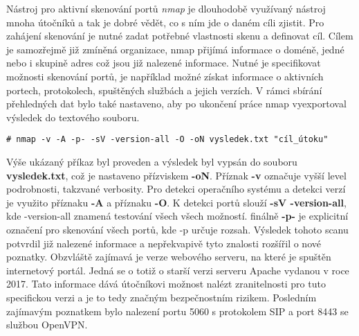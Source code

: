 Nástroj pro aktivní skenování portů \textit{nmap} je dlouhodobě využívaný nástroj mnoha útočníků a tak je dobré vědět, co s ním jde o daném cíli zjistit.
Pro zahájení skenování je nutné zadat potřebné vlastnosti skenu a definovat cíl.
Cílem je samozřejmě již zmíněná organizace, nmap přijímá informace o doméně, jedné nebo i skupině adres což jsou již nalezené informace.
Nutné je specifikovat možnosti skenování portů, je například možné získat informace o aktivních portech, protokolech, spuštěných službách a jejich verzích.
V rámci sbírání přehledných dat bylo také nastaveno, aby po ukončení práce nmap vyexportoval výsledek do textového souboru.

\begin{codeblock}
	\begin{verbatim}
# nmap -v -A -p- -sV -version-all -O -oN vysledek.txt "cíl_útoku"
	\end{verbatim}
\end{codeblock}

Výše ukázaný příkaz byl proveden a výsledek byl vypsán do souboru \textbf{vysledek.txt}, což je nastaveno přízviskem \textbf{-oN}.
Příznak \textbf{-v} označuje vyšší level podrobnosti, takzvané verbosity.
Pro detekci operačního systému a detekci verzí je využito příznaku \textbf{-A} a příznaku \textbf{-O}.
K detekci portů slouží \textbf{-sV -version-all}, kde -version-all znamená testování všech všech možností.
finálně \textbf{-p-} je explicitní označení pro skenování všech portů, kde -p určuje rozsah.
Výsledek tohoto scanu potvrdil již nalezené informace a nepřekvapivě tyto znalosti rozšířil o nové poznatky.
Obzvláště zajímavá je verze webového serveru, na které je spuštěn internetový portál.
Jedná se o totiž o starší verzi serveru Apache vydanou v roce 2017.
Tato informace dává útočníkovi možnost nalézt zranitelnosti pro tuto specifickou verzi a je to tedy značným bezpečnostním rizikem.
Posledním zajímavým poznatkem bylo nalezení portu 5060 s protokolem SIP a port 8443 se službou OpenVPN\@.

